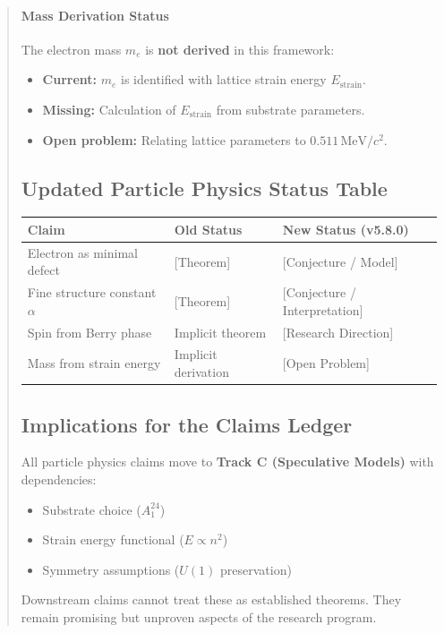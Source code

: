 \documentclass[11pt,titlepage]{article}
\begin{document}
\begin{abstract}
\paragraph{Mass Derivation Status}
The electron mass $m_e$ is \textbf{not derived} in this framework:
\begin{itemize}
\item \textbf{Current:} $m_e$ is identified with lattice strain energy $E_{\text{strain}}$.
\item \textbf{Missing:} Calculation of $E_{\text{strain}}$ from substrate parameters.
\item \textbf{Open problem:} Relating lattice parameters to $0.511\,\text{MeV}/c^2$.
\end{itemize}

\subsection{Updated Particle Physics Status Table}
\begin{center}
\begin{tabular}{p{}p{}p{}}
\textbf{Claim} & \textbf{Old Status} & \textbf{New Status (v5.8.0)} \\ \hline
Electron as minimal defect & [Theorem] & [Conjecture / Model] \\
Fine structure constant $\alpha$ & [Theorem] & [Conjecture / Interpretation] \\
Spin from Berry phase & Implicit theorem & [Research Direction] \\
Mass from strain energy & Implicit derivation & [Open Problem] \\
\end{tabular}
\end{center}

\subsection{Implications for the Claims Ledger}
All particle physics claims move to \textbf{Track C (Speculative Models)} with dependencies:
\begin{itemize}
\item Substrate choice ($A_1^{24}$)
\item Strain energy functional ($E \propto n^2$)
\item Symmetry assumptions ($U(1)$ preservation)
\end{itemize}

Downstream claims cannot treat these as established theorems. They remain promising but unproven aspects of the research program.


\end{abstract}
\end{document}
